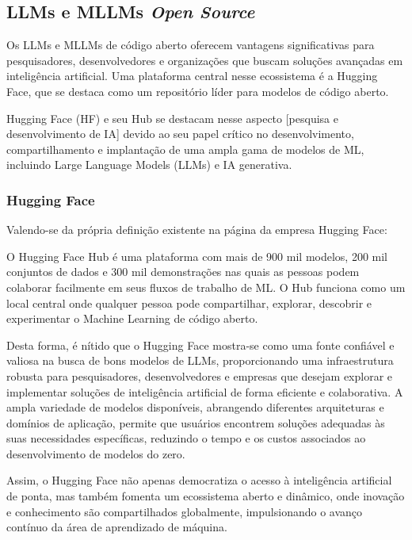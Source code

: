 \subsection{LLMs e MLLMs \textit{Open Source}}

Os LLMs e MLLMs de código aberto oferecem vantagens significativas para pesquisadores, desenvolvedores e organizações que buscam soluções avançadas em inteligência artificial. Uma plataforma central nesse ecossistema é a Hugging Face, que se destaca como um repositório líder para modelos de código aberto.

\begin{citacao}
    Hugging Face (HF) e seu Hub se destacam nesse aspecto [pesquisa e desenvolvimento de IA] devido ao seu papel crítico no desenvolvimento, compartilhamento e implantação de uma ampla gama de modelos de ML, incluindo Large Language Models (LLMs) e IA generativa. \cite{Castano2023}
\end{citacao}

\subsubsection{Hugging Face}

Valendo-se da própria definição existente na página da empresa Hugging Face:

\begin{citacao}
    O Hugging Face Hub é uma plataforma com mais de 900 mil modelos, 200 mil conjuntos de dados e 300 mil demonstrações nas quais as pessoas podem colaborar facilmente em seus fluxos de trabalho de ML. O Hub funciona como um local central onde qualquer pessoa pode compartilhar, explorar, descobrir e experimentar o Machine Learning de código aberto. \cite{huggingface2023}
\end{citacao}

Desta forma, é nítido que o Hugging Face mostra-se como uma fonte confiável e valiosa na busca de bons modelos de LLMs, proporcionando uma infraestrutura robusta para pesquisadores, desenvolvedores e empresas que desejam explorar e implementar soluções de inteligência artificial de forma eficiente e colaborativa. A ampla variedade de modelos disponíveis, abrangendo diferentes arquiteturas e domínios de aplicação, permite que usuários encontrem soluções adequadas às suas necessidades específicas, reduzindo o tempo e os custos associados ao desenvolvimento de modelos do zero.

Assim, o Hugging Face não apenas democratiza o acesso à inteligência artificial de ponta, mas também fomenta um ecossistema aberto e dinâmico, onde inovação e conhecimento são compartilhados globalmente, impulsionando o avanço contínuo da área de aprendizado de máquina.

